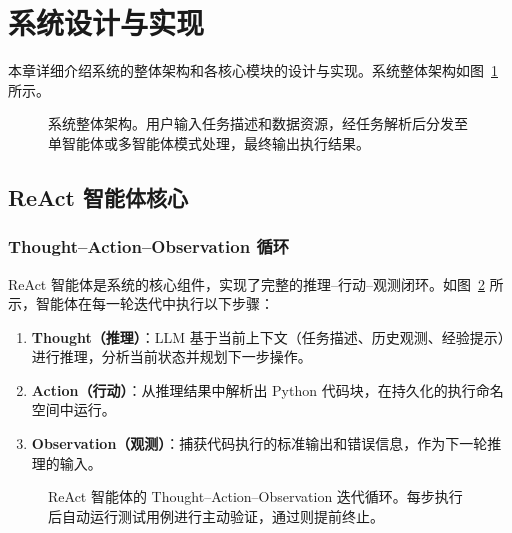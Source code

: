 \section{系统设计与实现}

本章详细介绍系统的整体架构和各核心模块的设计与实现。系统整体架构如图~\ref{fig:system-arch} 所示。

\begin{figure}[htbp]
    \centering
    \caption{系统整体架构。用户输入任务描述和数据资源，经任务解析后分发至单智能体或多智能体模式处理，最终输出执行结果。}
    \label{fig:system-arch}
\end{figure}

\subsection{ReAct 智能体核心}

\subsubsection{Thought--Action--Observation 循环}

ReAct 智能体是系统的核心组件，实现了完整的推理--行动--观测闭环。如图~\ref{fig:react-loop} 所示，智能体在每一轮迭代中执行以下步骤：

\begin{enumerate}
    \item \textbf{Thought（推理）}：LLM 基于当前上下文（任务描述、历史观测、经验提示）进行推理，分析当前状态并规划下一步操作。
    \item \textbf{Action（行动）}：从推理结果中解析出 Python 代码块，在持久化的执行命名空间中运行。
    \item \textbf{Observation（观测）}：捕获代码执行的标准输出和错误信息，作为下一轮推理的输入。
\end{enumerate}

\begin{figure}[htbp]
    \centering
    \caption{ReAct 智能体的 Thought--Action--Observation 迭代循环。每步执行后自动运行测试用例进行主动验证，通过则提前终止。}
    \label{fig:react-loop}
\end{figure}

